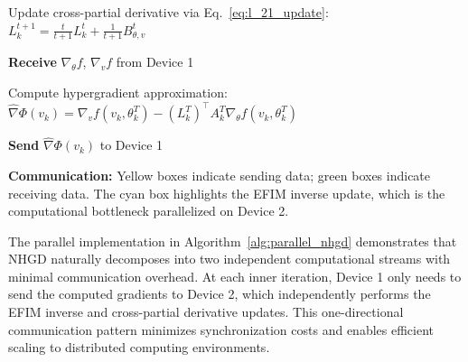 \documentclass[11 pt]{article}
\begin{document}
\begin{algorithm*}[htbp]
\begin{minipage}[t]{0.48\textwidth}
\begin{algorithmic}[1]
{{                }}
                \STATE Update cross-partial derivative via Eq.~\eqref{eq:l_21_update}:
                \STATE \quad $L^{t+1}_k=\frac{t}{t+1}L^{t}_k + \frac{1}{t+1} B_{\theta,v}^t$
            \ENDFOR
            \STATE \colorbox{green!20}{\parbox{\dimexpr\linewidth-2\fboxsep}{\strut \textbf{Receive} $\nabla_\theta f$, $\nabla_v f$ from Device 1\strut}}
            \STATE Compute hypergradient approximation:
            \STATE \quad 
            {\small$\widehat{\nabla} \Phi(v_k)=\nabla_vf(v_k, \theta_k^T)- (L_k^T)^\top A_k^T \nabla_\theta f(v_k,\theta_k^T)$}
            \STATE \colorbox{yellow!20}{\parbox{\dimexpr\linewidth-2\fboxsep}{\strut \textbf{Send} $\widehat{\nabla} \Phi(v_k)$ to Device 1\strut}}
        \ENDFOR
        \end{algorithmic}
    \end{minipage}
    \vspace{0.5em}
    
    \noindent\textbf{Communication:} Yellow boxes indicate sending data; green boxes indicate receiving data. The cyan box highlights the EFIM inverse update, which is the computational bottleneck parallelized on Device 2.
\end{algorithm*}

The parallel implementation in Algorithm~\ref{alg:parallel_nhgd} demonstrates that NHGD naturally decomposes into two independent computational streams with minimal communication overhead. At each inner iteration, Device 1 only needs to send the computed gradients to Device 2, which independently performs the EFIM inverse and cross-partial derivative updates. This one-directional communication pattern minimizes synchronization costs and enables efficient scaling to distributed computing environments.


\newpage
\end{document}
